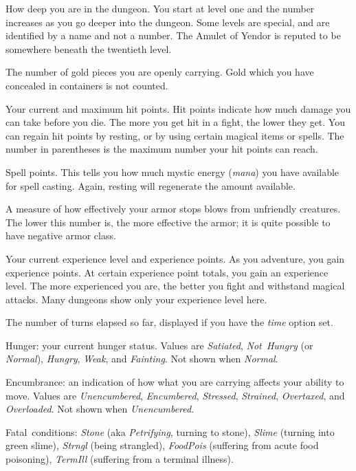 \item[\bb{Dungeon Level}]
How deep you are in the dungeon.  You start at level one and the number
increases as you go deeper into the dungeon.  Some levels are special,
and are identified by a name and not a number.  The Amulet of Yendor is
reputed to be somewhere beneath the twentieth level.
\item[\bb{Gold}]
The number of gold pieces you are openly carrying.  Gold which you have
concealed in containers is not counted.
\item[\bb{Hit Points}]
Your current and maximum hit points.  Hit points indicate how much
damage you can take before you die.  The more you get hit in a fight,
the lower they get.  You can regain hit points by resting, or by using
certain magical items or spells.  The number in parentheses is the maximum
number your hit points can reach.
\item[\bb{Power}]
Spell points.  This tells you how much mystic energy ({\it mana\/})
you have available for spell casting.  Again, resting will regenerate the
amount available.
\item[\bb{Armor Class}]
A measure of how effectively your armor stops blows from unfriendly
creatures.  The lower this number is, the more effective the armor; it
is quite possible to have negative armor class.
\item[\bb{Experience}]
Your current experience level and experience points.  As you
adventure, you gain experience points.  At certain experience point
totals, you gain an experience level.  The more experienced you are,
the better you fight and withstand magical attacks.  Many dungeons
show only your experience level here.
\item[\bb{Time}]
The number of turns elapsed so far, displayed if you have the
{\it time\/} option set.
\item[\bb{Status}]
Hunger:
your current hunger status.
Values are {\it Satiated}, {\it Not~Hungry\/} (or {\it Normal\/}),
{\it Hungry}, {\it Weak}, and {\it Fainting}.
Not shown when {\it Normal}.

Encumbrance:
an indication of how what you are carrying affects your ability to move.
Values are {\it Unencumbered}, {\it Encumbered}, {\it Stressed},
{\it Strained}, {\it Overtaxed}, and {\it Overloaded}.
Not shown when {\it Unencumbered}.

Fatal~conditions:
{\it Stone\/} (aka {\it Petrifying}, turning to stone),
{\it Slime\/} (turning into green slime),
{\it Strngl\/} (being strangled),
{\it FoodPois\/} (suffering from acute food poisoning),
{\it TermIll\/} (suffering from a terminal illness).

